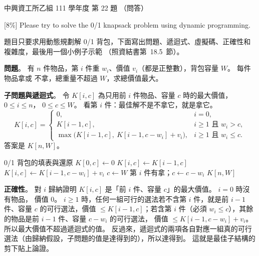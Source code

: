 \begin{pastexam}[label={px:nchu-111-is-11}]{中興資工所乙組 111 學年度 第 22 題}
（問答）

{[8\%]} Please try to solve the 0/1 knapsack problem using dynamic programming.
\end{pastexam}

\begin{pastsoln}
題目只要求用動態規劃解 0/1 背包，下面寫出問題、遞迴式、虛擬碼、正確性和複雜度，最後用一個小例子示範
（照資結書第~18.5~節）。

\textbf{問題}。 有 $n$ 件物品，第 $i$ 件重 $w_i$、價值 $v_i$（都是正整數），背包容量 $W$。 每件物品拿或
不拿，總重量不超過 $W$，求總價值最大。

\textbf{子問題與遞迴式}。 令 $K[i, c]$ 為只用前 $i$ 件物品、容量 $c$ 時的最大價值，$0 \le i \le n$，
$0 \le c \le W$。 看第 $i$ 件：最佳解不是不拿它，就是拿它。
\[
K[i, c] = \begin{cases}
0, & i = 0, \\
K[i - 1, c], & i \ge 1 \text{ 且 } w_i > c, \\
\max\bigl(K[i - 1, c],\ K[i - 1, c - w_i] + v_i\bigr), & i \ge 1 \text{ 且 } w_i \le c .
\end{cases}
\]
答案是 $K[n, W]$。

\begin{pseudo}{0/1 背包的填表與還原}
        \State $K[0, c] \gets 0$
    \EndFor
            \State $K[i, c] \gets K[i - 1, c]$ 
                \State $K[i, c] \gets K[i - 1, c - w_i] + v_i$ 
            \EndIf
        \EndFor
    \EndFor
    \State $c \gets W$ 
            \State 第 $i$ 件有拿；$c \gets c - w_i$
        \EndIf
    \EndFor
    \State \Return $K[n, W]$
\EndFunction
\end{pseudo}

\textbf{正確性}。 對 $i$ 歸納證明 $K[i, c]$ 是「前 $i$ 件、容量 $c$」的最大價值。 $i = 0$ 時沒有物品，
價值 $0$。 $i \ge 1$ 時，任何一組可行的選法若不含第 $i$ 件，就是前 $i - 1$ 件、容量 $c$ 的可行選法，價值
$\le K[i-1, c]$；若含第 $i$ 件（必須 $w_i \le c$），其餘的物品是前 $i - 1$ 件、容量 $c - w_i$ 的可行選法，
價值 $\le K[i-1, c-w_i] + v_i$。 所以最大價值不超過遞迴式的值。 反過來，遞迴式的兩項各自對應一組真的可行
選法（由歸納假設，子問題的值是達得到的），所以達得到。 這就是最佳子結構的剪下貼上論證。


\end{pastsoln}

